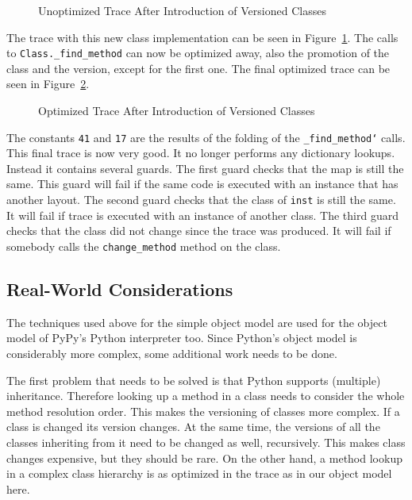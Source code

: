 \documentclass{sig-alternate}
\begin{document}
\begin{figure}

\caption{Unoptimized Trace After Introduction of Versioned Classes}
\label{fig:trace4}
\end{figure}

The trace with this new class implementation can be seen in
Figure~\ref{fig:trace4}.
The calls to \texttt{Class.\_find\_method} can now be optimized away, also the
promotion of the class and the version, except for the first one. The final
optimized trace can be seen in Figure~\ref{fig:trace5}.

\begin{figure}

\caption{Optimized Trace After Introduction of Versioned Classes}
\label{fig:trace5}
\end{figure}

The constants \texttt{41} and \texttt{17} are the results of the folding of the
\texttt{\_find\_method`} calls. This final trace is now very good. It no longer performs any
dictionary lookups. Instead it contains several guards. The first guard
checks that the map is still the same. This guard will fail if the same
code is executed with an instance that has another layout. The second guard
checks that the class of \texttt{inst} is still the same. It will fail if trace is
executed with an instance of another class. The third guard checks that the
class did not change since the trace was produced. It will fail if somebody
calls the \texttt{change\_method} method on the class.



\subsection{Real-World Considerations}

The techniques used above for the simple object model are used for the object
model of PyPy's Python interpreter too. Since Python's object model is
considerably more complex, some additional work needs to be done.

The first problem that needs to be solved is that Python supports (multiple)
inheritance. Therefore looking up a method in a class needs to consider the
whole method resolution order. This makes the versioning of classes more
complex. If a class is changed its version changes. At the same time, the
versions of all the classes inheriting from it need to be changed as well,
recursively. This makes class changes expensive, but they should be rare.  On the
other hand, a method lookup in a complex class hierarchy is as optimized in the
trace as in our object model here.
\end{document}
